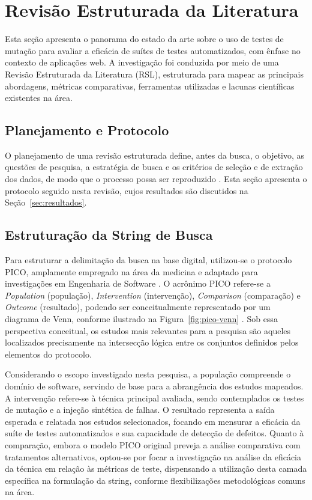 \chapter{Revisão Estruturada da Literatura}
\label{cap:revisao-literatura}

Esta seção apresenta o panorama do estado da arte sobre o uso de testes de mutação para avaliar a eficácia de suítes de testes automatizados, com ênfase no contexto de aplicações web. A investigação foi conduzida por meio de uma Revisão Estruturada da Literatura (RSL), estruturada para mapear as principais abordagens, métricas comparativas, ferramentas utilizadas e lacunas científicas existentes na área.

\section{Planejamento e Protocolo}
\label{sec:planejamento-protocolo}

O planejamento de uma revisão estruturada define, antes da busca, o objetivo, as questões de pesquisa, a estratégia de busca e os critérios de seleção e de extração dos dados, de modo que o processo possa ser reproduzido \cite{kitchenham2007}. Esta seção apresenta o protocolo seguido nesta revisão, cujos resultados são discutidos na Seção~\ref{sec:resultados}.

\section{Estruturação da String de Busca}
\label{subsec:string-busca}

Para estruturar a delimitação da busca na base digital, utilizou-se o protocolo PICO, amplamente empregado na área da medicina e adaptado para investigações em Engenharia de Software \cite{kitchenham2007}. O acrônimo PICO refere-se a \textit{Population} (população), \textit{Intervention} (intervenção), \textit{Comparison} (comparação) e \textit{Outcome} (resultado), podendo ser conceitualmente representado por um diagrama de Venn, conforme ilustrado na Figura~\ref{fig:pico-venn} \cite{pai2004}. Sob essa perspectiva conceitual, os estudos mais relevantes para a pesquisa são aqueles localizados precisamente na intersecção lógica entre os conjuntos definidos pelos elementos do protocolo.

Considerando o escopo investigado nesta pesquisa, a população compreende o domínio de software, servindo de base para a abrangência dos estudos mapeados. A intervenção refere-se à técnica principal avaliada, sendo contemplados os testes de mutação e a injeção sintética de falhas. O resultado representa a saída esperada e relatada nos estudos selecionados, focando em mensurar a eficácia da suíte de testes automatizados e sua capacidade de detecção de defeitos. Quanto à comparação, embora o modelo PICO original preveja a análise comparativa com tratamentos alternativos, optou-se por focar a investigação na análise da eficácia da técnica em relação às métricas de teste, dispensando a utilização desta camada específica na formulação da string, conforme flexibilizações metodológicas comuns na área.

